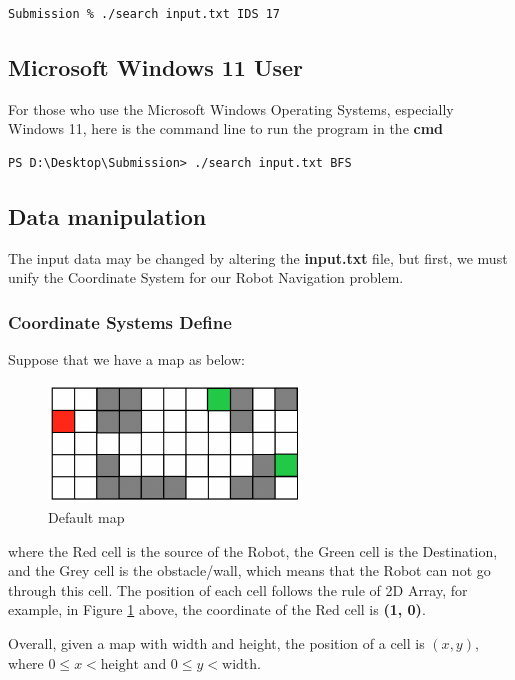 \documentclass{assignment}
\begin{document}
\begin{verbatim}
Submission % ./search input.txt IDS 17 
\end{verbatim}

\subsection{Microsoft Windows 11 User}
For those who use the Microsoft Windows Operating Systems, especially Windows 11, here is the command line to run the program in the \textbf{cmd}

\begin{verbatim}
PS D:\Desktop\Submission> ./search input.txt BFS 
\end{verbatim}

\subsection{Data manipulation}
The input data may be changed by altering the \textbf{input.txt} file, but first, we must unify the Coordinate System for our Robot Navigation problem.
\subsubsection{Coordinate Systems Define}

Suppose that we have a map as below:
\begin{figure}[h]
    \centering
    \includegraphics[width=0.6\textwidth]{./assets/Figure2.png}
    \caption{Default map}
    \label{fig:fig2}
\end{figure}

where the Red cell is the source of the Robot, the Green cell is the Destination, and the Grey cell is the obstacle/wall, which means that the Robot can not go through this cell. The position of each cell follows the rule of 2D Array, for example, in Figure \ref{fig:fig2} above, the coordinate of the Red cell is \textbf{(1, 0)}. 

Overall, given a map with width and height, the position of a cell is $(x, y)$, where $0 \leq x < \text{height}$ and $0 \leq y < \text{width.}$
\end{document}
